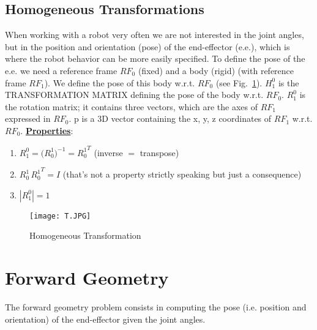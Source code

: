 \subsection{Homogeneous Transformations}
                    When working with a robot very often we are not interested in the joint angles, but in the position and orientation (pose) of the end-effector (e.e.), which is where the robot behavior can be more easily specified.
                    To define the pose of the e.e. we need a reference frame $RF_0$ (fixed) and a body (rigid) (with reference frame $RF_1$).
                    We define the pose of this body w.r.t. $RF_0$ (see Fig.~\ref{fig:homogeneous}).
                    $H^{0}_1$ is the TRANSFORMATION MATRIX defining the pose of the body w.r.t. $RF_0$.
                    $R^{0}_1$ is the rotation matrix; it contains three vectors, which are the axes of $RF_1$ expressed in $RF_0$.
                    p is a 3D vector containing the x, y, z coordinates of $RF_1$ w.r.t. $RF_0$. 
                    \newline
                    \underline{\textbf{Properties}}:
                        \begin{enumerate}
                            \item $R^{0}_{1} = {(R^{1}_0})^{-1} = {R^{1}_0}^{T}$ (inverse $=$ transpose)
                            
                            \item $R^{1}_{0} \, {R^{1}_0}^{T} = I$ (that's not a property strictly speaking but just a consequence)
                            
                            \item $|R^{0}_{1}| = 1$
                        \end{enumerate}
                    \begin{figure}[t]    
                        \texttt{[image: T.JPG]}
                        \caption{Homogeneous Transformation}
                        \label{fig:homogeneous}
                    \end{figure}
                
\section{Forward Geometry}
The forward geometry problem consists in computing the pose (i.e. position and orientation) of the end-effector given the joint angles.

